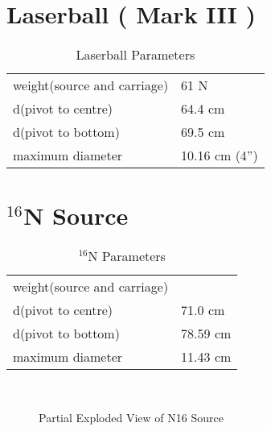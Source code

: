 \begin{description}
\clearpage
\section{Laserball ( Mark III )}
  
\begin{table}[htb]
\begin{center}
\begin{tabular}{|l|l|}
\hline
weight(source and carriage) & 61 N  \\
d(pivot to centre)          & 64.4 cm  \\
d(pivot to bottom)          & 69.5 cm \\
maximum diameter            & 10.16 cm (4'')\\
\hline
\end{tabular}
\caption[Laserball Parameters]
        {Laserball Parameters
        }
\end{center}
\end{table}
  
  



\clearpage
\section{$^{16}$N Source}
  
\begin{table}[htb]
\begin{center}
\begin{tabular}{|l|l|}
\hline
weight(source and carriage) & \\
d(pivot to centre)          &  71.0 cm\\
d(pivot to bottom)          & 78.59 cm  \\
maximum diameter            & 11.43 cm \\
\hline
\end{tabular}
\caption[$^{16}$N Parameters]
        {$^{16}$N Parameters
        }
\end{center}
\end{table}


\begin{figure}
\begin{center}
\leavevmode
\epsfxsize=7in
~\\
\caption[Exploded View of N16 Source]
        {Partial Exploded View of N16 Source
        }


\end{center}
\end{figure}
\end{description}
